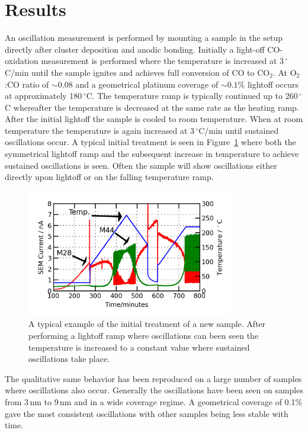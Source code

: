 \documentclass[8.5pt,twoside,twocolumn]{article}
\begin{document}
\section{Results}
An oscillation measurement is performed by mounting a sample in the setup directly after cluster deposition and anodic bonding. Initially a light-off CO-oxidation measurement is performed where the temperature is increased at 3\,$^\circ$C/min until the sample ignites and achieves full conversion of CO to CO$_2$. At O$_2$:CO ratio of $\sim0.08$ and a geometrical platinum coverage of $\sim0.1\%$ lightoff occurs at approximately 180\,$^\circ$C. The temperature ramp is typically continued up to 260\,$^\circ$C whereafter the temperature is decreased at the same rate as the heating ramp. After the initial lightoff the sample is cooled to room temperature. When at room temperature the temperature is again increased at 3\,$^\circ$C/min until sustained oscillations occur. A typical initial treatment is seen in Figure~\ref{fgr:initial_treatment} where both the symmetrical lightoff ramp and the subsequent increase in temperature to achieve sustained oscillations is seen. Often the sample will show oscillations either directly upon lightoff or on the falling temperature ramp.
\begin{figure}[h]
\centering
  \includegraphics[width=9cm]{initial_treatment.png}
  \caption{A typical example of the initial treatment of a new sample. After performing a lightoff ramp where oscillations can been seen the temperature is increased to a constant value where sustained oscillations take place.}
  \label{fgr:initial_treatment}
\end{figure}
The qualitative same behavior has been reproduced on a large number of samples where oscillations also occur. Generally the oscillations have been seen on samples from 3\,nm to 9\,nm and in a wide coverage regime. A geometrical coverage of 0.1\% gave the most consistent oscillations with other samples being less stable with time.
\end{document}
